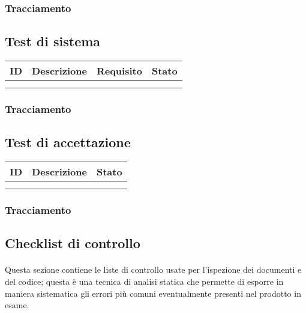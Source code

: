 {{{{{{{{{    \subsubsection{Tracciamento}

\subsection{Test di sistema}
    {\renewcommand{\arraystretch}{1.5}
    \begin{tabularx}{\textwidth}{p{}|p{}|p{}|X}
    \textbf{ID} & \textbf{Descrizione} & \textbf{Requisito} & \textbf{Stato}  \\
    \hline
     &  & \\
    \hline
     &  &  \\
    \end{tabularx}}
    \subsubsection{Tracciamento}

\subsection{Test di accettazione}
    {\renewcommand{\arraystretch}{1.5}
    \begin{tabularx}{\textwidth}{p{}|p{}|X}
    \textbf{ID} & \textbf{Descrizione} & \textbf{Stato}  \\
    \hline
     &  & \\
    \hline
     &  &  \\
    \end{tabularx}}
    \subsubsection{Tracciamento}

\subsection{Checklist di controllo}
\paragraph{}Questa sezione contiene le liste di controllo usate per l'ispezione dei documenti e del codice; questa è una tecnica di analisi statica che permette di esporre in maniera sistematica gli errori più comuni eventualmente presenti nel prodotto in esame.
}}}}}}}}}
